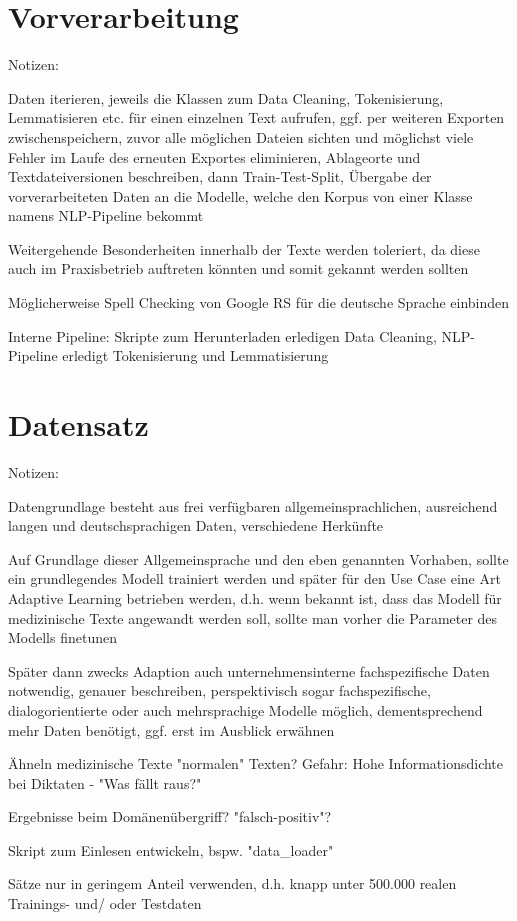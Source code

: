 \section{Vorverarbeitung}
Notizen:
	\item Daten iterieren, jeweils die Klassen zum Data Cleaning, Tokenisierung, Lemmatisieren etc. für einen einzelnen Text aufrufen, ggf. per weiteren Exporten zwischenspeichern, zuvor alle möglichen Dateien sichten und möglichst viele Fehler im Laufe des erneuten Exportes eliminieren, Ablageorte und Textdateiversionen beschreiben, dann Train-Test-Split, Übergabe der vorverarbeiteten Daten an die Modelle, welche den Korpus von einer Klasse namens NLP-Pipeline bekommt
	\item Weitergehende Besonderheiten innerhalb der Texte werden toleriert, da diese auch im Praxisbetrieb auftreten könnten und somit gekannt werden sollten
	\item Möglicherweise Spell Checking von Google RS für die deutsche Sprache einbinden
	\item Interne Pipeline: Skripte zum Herunterladen erledigen Data Cleaning, NLP-Pipeline erledigt Tokenisierung und Lemmatisierung


\section{Datensatz}
Notizen:
	\item Datengrundlage besteht aus frei verfügbaren allgemeinsprachlichen, ausreichend langen und deutschsprachigen Daten, verschiedene Herkünfte
	\item Auf Grundlage dieser Allgemeinsprache und den eben genannten Vorhaben, sollte ein grundlegendes Modell trainiert werden und später für den Use Case eine Art Adaptive Learning betrieben werden, d.h. wenn bekannt ist, dass das Modell für medizinische Texte angewandt werden soll, sollte man vorher die Parameter des Modells finetunen
	\item Später dann zwecks Adaption auch unternehmensinterne fachspezifische Daten notwendig, genauer beschreiben, perspektivisch sogar fachspezifische, dialogorientierte oder auch mehrsprachige Modelle möglich, dementsprechend mehr Daten benötigt, ggf. erst im Ausblick erwähnen
	\item Ähneln medizinische Texte "normalen" Texten? Gefahr: Hohe Informationsdichte bei Diktaten - "Was fällt raus?"
	\item Ergebnisse beim Domänenübergriff? "falsch-positiv"?
	\item Skript zum Einlesen entwickeln, bspw. "data_loader"
	\item Sätze nur in geringem Anteil verwenden, d.h. knapp unter 500.000 realen Trainings- und/ oder Testdaten
